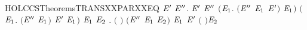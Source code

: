 \newcommand{\HOLCCSTheoremsTRANSXXPAR}{\UseVerbatim{HOLCCSTheoremsTRANSXXPAR}}
\begin{SaveVerbatim}{HOLCCSTheoremsTRANSXXPARXXEQ}
\HOLTokenTurnstile{} \HOLSymConst{\HOLTokenForall{}} \ensuremath{\HOLBoundVar{E}\sp{\prime}}  \ensuremath{\HOLBoundVar{E}\sp{\prime\prime}}.
        \HOLSymConst{\ensuremath{\mid}} \ensuremath{\HOLBoundVar{E}\sp{\prime}} \HOLTokenTransBegin{}\HOLTokenTransEnd \ensuremath{\HOLBoundVar{E}\sp{\prime\prime}} \HOLSymConst{\HOLTokenEquiv{}}
       \ensuremath{(}\HOLSymConst{\HOLTokenExists{}}\ensuremath{\HOLBoundVar{E}\sb{\mathrm{1}}}. \ensuremath{(}\ensuremath{\HOLBoundVar{E}\sp{\prime\prime}} \HOLSymConst{\ensuremath{=}} \ensuremath{\HOLBoundVar{E}\sb{\mathrm{1}}} \HOLSymConst{\ensuremath{\mid}} \ensuremath{\HOLBoundVar{E}\sp{\prime}}\ensuremath{)} \HOLSymConst{\HOLTokenConj{}}  \HOLTokenTransBegin{}\HOLTokenTransEnd \ensuremath{\HOLBoundVar{E}\sb{\mathrm{1}}}\ensuremath{)} \HOLSymConst{\HOLTokenDisj{}}
       \ensuremath{(}\HOLSymConst{\HOLTokenExists{}}\ensuremath{\HOLBoundVar{E}\sb{\mathrm{1}}}. \ensuremath{(}\ensuremath{\HOLBoundVar{E}\sp{\prime\prime}} \HOLSymConst{\ensuremath{=}}  \HOLSymConst{\ensuremath{\mid}} \ensuremath{\HOLBoundVar{E}\sb{\mathrm{1}}}\ensuremath{)} \HOLSymConst{\HOLTokenConj{}} \ensuremath{\HOLBoundVar{E}\sp{\prime}} \HOLTokenTransBegin{}\HOLTokenTransEnd \ensuremath{\HOLBoundVar{E}\sb{\mathrm{1}}}\ensuremath{)} \HOLSymConst{\HOLTokenDisj{}}
       \HOLSymConst{\HOLTokenExists{}}\ensuremath{\HOLBoundVar{E}\sb{\mathrm{1}}} \ensuremath{\HOLBoundVar{E}\sb{\mathrm{2}}} .
           \ensuremath{(} \HOLSymConst{\ensuremath{=}} \HOLConst{\ensuremath{\tau}}\ensuremath{)} \HOLSymConst{\HOLTokenConj{}} \ensuremath{(}\ensuremath{\HOLBoundVar{E}\sp{\prime\prime}} \HOLSymConst{\ensuremath{=}} \ensuremath{\HOLBoundVar{E}\sb{\mathrm{1}}} \HOLSymConst{\ensuremath{\mid}} \ensuremath{\HOLBoundVar{E}\sb{\mathrm{2}}}\ensuremath{)} \HOLSymConst{\HOLTokenConj{}}  \HOLTokenTransBegin{} \HOLTokenTransEnd \ensuremath{\HOLBoundVar{E}\sb{\mathrm{1}}} \HOLSymConst{\HOLTokenConj{}}
           \ensuremath{\HOLBoundVar{E}\sp{\prime}} \HOLTokenTransBegin{} \ensuremath{(} \ensuremath{)}\HOLTokenTransEnd \ensuremath{\HOLBoundVar{E}\sb{\mathrm{2}}}
\end{SaveVerbatim}
\newcommand{\HOLCCSTheoremsTRANSXXPARXXEQ}{\UseVerbatim{HOLCCSTheoremsTRANSXXPARXXEQ}}
